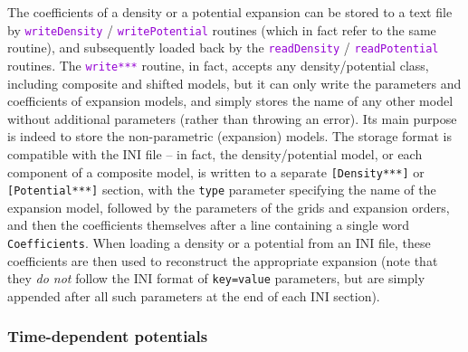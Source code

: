 \documentclass[12pt]{article}
\newcommand{\ttt}[1]{\textcolor{darkviolet}{\texttt{#1}}}
\newcommand{\ppp}[1]{\textcolor{darkolive} {\texttt{#1}}}
\begin{document}
The coefficients of a density or a potential expansion can be stored to a text file by \ttt{writeDensity} / \ttt{writePotential} routines (which in fact refer to the same routine), and subsequently loaded back by the \ttt{readDensity} / \ttt{readPotential} routines. 
The \ttt{write***} routine, in fact, accepts any density/potential class, including composite and shifted models, but it can only write the parameters and coefficients of expansion models, and simply stores the name of any other model without additional parameters (rather than throwing an error). Its main purpose is indeed to store the non-parametric (expansion) models. The storage format is compatible with the INI file -- in fact, the density/potential model, or each component of a composite model, is written to a separate \ppp{[Density***]} or \ppp{[Potential***]} section, with the \ppp{type} parameter specifying the name of the expansion model, followed by the parameters of the grids and expansion orders, and then the coefficients themselves after a line containing a single word \texttt{Coefficients}. When loading a density or a potential from an INI file, these coefficients are then used to reconstruct the appropriate expansion (note that they \emph{do not} follow the INI format of \texttt{key=value} parameters, but are simply appended after all such parameters at the end of each INI section).

\subsubsection{Time-dependent potentials}  \label{sec:PotentialEvolving}
\end{document}
